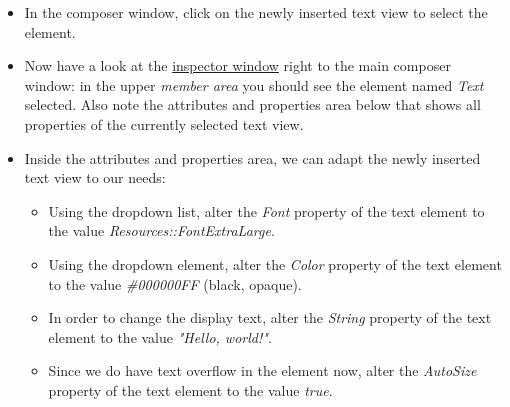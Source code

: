 \documentclass[
  a4paper,
,tablecaptionabove
]{scrbook}
\begin{document}
\begin{itemize}
\item
  In the composer window, click on the newly inserted text view to
  select the element.
\item
  Now have a look at the
  \href{https://doc.embedded-wizard.de/inspector-window}{inspector
  window} right to the main composer window: in the upper \emph{member
  area} you should see the element named \emph{Text} selected. Also note
  the attributes and properties area below that shows all properties of
  the currently selected text view.
\item
  Inside the attributes and properties area, we can adapt the newly
  inserted text view to our needs:

  \begin{itemize}
  \item
    Using the dropdown list, alter the \emph{Font} property of the text
    element to the value \emph{Resources::FontExtraLarge}.
  \item
    Using the dropdown element, alter the \emph{Color} property of the
    text element to the value \emph{\#000000FF} (black, opaque).
  \item
    In order to change the display text, alter the \emph{String}
    property of the text element to the value \emph{"Hello, world!"}.
  \item
    Since we do have text overflow in the element now, alter the
    \emph{AutoSize} property of the text element to the value
    \emph{true}.
  \end{itemize}
\end{itemize}
\end{document}
